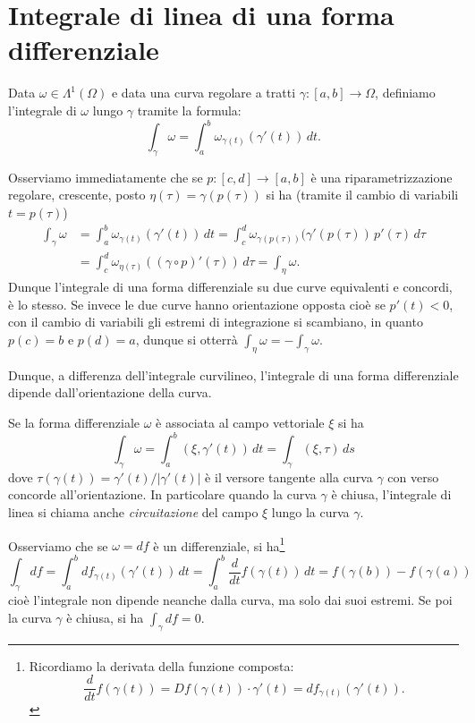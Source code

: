 \documentclass[italian,a4paper]{scrartcl}
\begin{document}
\section{Integrale di linea di una forma differenziale}

Data $\omega\in \Lambda^1(\Omega)$ e data una curva regolare a tratti 
$\gamma\colon [a,b]\to \Omega$, definiamo l'integrale di $\omega$
lungo $\gamma$ tramite la formula:
\[
\int_\gamma \omega = \int_a^b \omega_{\gamma(t)}(\gamma'(t))\, dt.
\]

Osserviamo immediatamente che se $p\colon[c,d]\to [a,b]$ è una
riparametrizzazione regolare, crescente, posto $\eta(\tau) =
\gamma(p(\tau))$ si ha (tramite il cambio di variabili $t=p(\tau)$)
\begin{align*}
\int_\gamma \omega 
&= \int_a^b \omega_{\gamma(t)}(\gamma'(t))\, d t
= \int_c^d \omega_{\gamma(p(\tau))}(\gamma'(p(\tau))\, p'(\tau)\, d\tau\\
&= \int_c^d \omega_{\eta(\tau)} ((\gamma\circ p)'(\tau))\, d\tau
= \int_\eta \omega.
\end{align*}
Dunque l'integrale di una forma differenziale su due curve equivalenti
e concordi, è lo stesso. Se invece le due curve hanno orientazione
opposta cioè se $p'(t)<0$, con il cambio di variabili gli estremi di
integrazione si scambiano, in quanto $p(c)=b$ e $p(d)=a$, dunque si
otterrà $\int_\eta \omega = - \int_\gamma \omega$.

Dunque, a differenza dell'integrale curvilineo, l'integrale di una
forma differenziale dipende dall'orientazione della curva.

Se la forma differenziale $\omega$ è associata al campo vettoriale
$\xi$ si ha
\[
  \int_\gamma \omega 
= \int_a^b (\xi, \gamma'(t))\, dt
= \int_\gamma (\xi, \tau)\, ds
\]
dove $\tau(\gamma(t)) = \gamma'(t) / \lvert \gamma'(t)\rvert$ è
il versore tangente alla curva $\gamma$ con verso concorde
all'orientazione. In particolare quando la curva $\gamma$ è chiusa, 
l'integrale di linea si chiama anche
\emph{circuitazione} del campo $\xi$ lungo la curva $\gamma$.

Osserviamo che se $\omega = df$ è un differenziale, si
ha\footnote{Ricordiamo la derivata della funzione composta:
\[
\frac{d}{dt} f(\gamma(t)) = Df(\gamma(t))\cdot \gamma'(t) = df_{\gamma(t)}(\gamma'(t)).
\]}
\[
\int_\gamma df = \int_a^b df_{\gamma(t)}(\gamma'(t))\, dt
= \int_a^b \frac{d}{dt} f(\gamma(t))\, dt = f(\gamma(b)) - f(\gamma(a))
\]
cioè l'integrale non dipende neanche dalla curva, ma solo dai suoi
estremi. Se poi la curva $\gamma$ è chiusa, si ha $\int_\gamma df = 0$.
\end{document}
